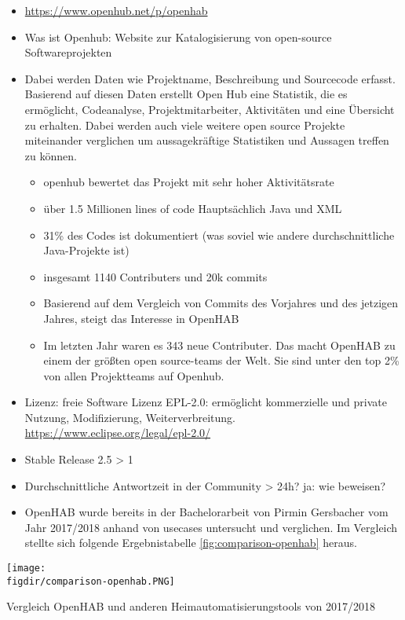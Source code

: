 \begin{itemize}
	\item \url{https://www.openhub.net/p/openhab}
	\item Was ist Openhub: Website zur Katalogisierung von open-source Softwareprojekten
	\item Dabei werden Daten wie Projektname, Beschreibung und Sourcecode erfasst. Basierend auf diesen Daten erstellt Open Hub eine Statistik, die es ermöglicht, Codeanalyse, Projektmitarbeiter, Aktivitäten und eine Übersicht zu erhalten. Dabei werden auch viele weitere open source Projekte miteinander verglichen um aussagekräftige Statistiken und Aussagen treffen zu können.
	\begin{itemize}
		\item openhub bewertet das Projekt mit sehr hoher Aktivitätsrate
		\item über 1.5 Millionen lines of code Hauptsächlich Java und XML
		\item 31\% des Codes ist dokumentiert (was soviel wie andere durchschnittliche Java-Projekte ist)
		\item insgesamt 1140 Contributers und 20k commits
		\item Basierend auf dem Vergleich von Commits des Vorjahres und des jetzigen Jahres, steigt das Interesse in OpenHAB
		\item Im letzten Jahr waren es 343 neue Contributer. Das macht OpenHAB zu einem der größten open source-teams der Welt. Sie sind unter den top 2\% von allen Projektteams auf Openhub.
	\end{itemize}
	\item Lizenz: freie Software Lizenz EPL-2.0: ermöglicht kommerzielle und private Nutzung, Modifizierung, Weiterverbreitung. \url{https://www.eclipse.org/legal/epl-2.0/}
	\item Stable Release 2.5 > 1
	\item Durchschnittliche Antwortzeit in der Community > 24h? ja: wie beweisen?
	\item OpenHAB wurde bereits in der Bachelorarbeit von Pirmin Gersbacher vom Jahr 2017/2018 anhand von usecases untersucht und verglichen. Im Vergleich stellte sich folgende Ergebnistabelle \ref{fig:comparison-openhab}\cite{BA01:OPH} heraus.
\end{itemize}

\begin{minipage}{\textwidth}
	\centering
	\captionsetup{type=figure}
	\texttt{[image: \\figdir/comparison-openhab.PNG]}
	\caption{Vergleich OpenHAB und anderen Heimautomatisierungstools von 2017/2018 \label{fig:comparison-openhab}}
\end{minipage}



